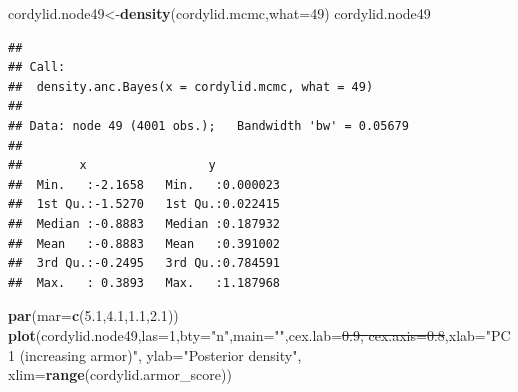 \documentclass[fleqn,10pt,lineno]{wlpeerj}
\newenvironment{Shaded}{\begin{snugshade}}{\end{snugshade}}
\newcommand{\AttributeTok}[1]{\textcolor[rgb]{0.13,0.29,0.53}{#1}}
\newcommand{\DecValTok}[1]{\textcolor[rgb]{0.00,0.00,0.81}{#1}}
\newcommand{\FloatTok}[1]{\textcolor[rgb]{0.00,0.00,0.81}{#1}}
\newcommand{\FunctionTok}[1]{\textcolor[rgb]{0.13,0.29,0.53}{\textbf{#1}}}
\newcommand{\NormalTok}[1]{#1}
\newcommand{\OtherTok}[1]{\textcolor[rgb]{0.56,0.35,0.01}{#1}}
\newcommand{\StringTok}[1]{\textcolor[rgb]{0.31,0.60,0.02}{#1}}
\providecommand{\DIFaddtex}[1]{{\protect\color{blue}\uwave{#1}}} %
\providecommand{\DIFdeltex}[1]{{\protect\color{red}\sout{#1}}}                      %
\providecommand{\DIFaddbegin}{} %
\providecommand{\DIFaddend}{} %
\providecommand{\DIFdelbegin}{} %
\providecommand{\DIFdelend}{} %
\providecommand{\DIFadd}[1]{\texorpdfstring{\DIFaddtex{#1}}{#1}} %
\providecommand{\DIFdel}[1]{\texorpdfstring{\DIFdeltex{#1}}{}} %
\newcommand{\DIFscaledelfig}{0.5}
\newlength{\DIFdelgraphicswidth} %
\newlength{\DIFdelgraphicsheight} %
\newcommand{\DIFaddincludegraphics}[2][]{{\color{blue}\fbox{\DIFOincludegraphics[#1]{#2}}}} %
\newcommand{\DIFdelincludegraphics}[2][]{%
\sbox{\DIFdelgraphicsbox}{\DIFOincludegraphics[#1]{#2}}%
\settoboxwidth{\DIFdelgraphicswidth}{\DIFdelgraphicsbox} %
\settoboxtotalheight{\DIFdelgraphicsheight}{\DIFdelgraphicsbox} %
\scalebox{\DIFscaledelfig}{%
\parbox[b]{\DIFdelgraphicswidth}{\usebox{\DIFdelgraphicsbox}\\[-\baselineskip] \rule{\DIFdelgraphicswidth}{0em}}\llap{\resizebox{\DIFdelgraphicswidth}{\DIFdelgraphicsheight}{%
\setlength{\unitlength}{\DIFdelgraphicswidth}%
\begin{picture}(1,1)%
\thicklines\linethickness{2pt} %
{\color[rgb]{1,0,0}\put(0,0){\framebox(1,1){}}}%
{\color[rgb]{1,0,0}\put(0,0){\line( 1,1){1}}}%
{\color[rgb]{1,0,0}\put(0,1){\line(1,-1){1}}}%
\end{picture}%
}\hspace*{3pt}}} %
} %
\DeclareRobustCommand{\DIFaddbegin}{\DIFOaddbegin \let\includegraphics\DIFaddincludegraphics} %
\DeclareRobustCommand{\DIFaddend}{\DIFOaddend \let\includegraphics\DIFOincludegraphics} %
\DeclareRobustCommand{\DIFdelbegin}{\DIFOdelbegin \let\includegraphics\DIFdelincludegraphics} %
\DeclareRobustCommand{\DIFdelend}{\DIFOaddend \let\includegraphics\DIFOincludegraphics} %
\begin{document}
\begin{Shaded}
\begin{Highlighting}[]
\NormalTok{cordylid.node49}\OtherTok{\textless{}{-}}\FunctionTok{density}\NormalTok{(cordylid.mcmc,}\AttributeTok{what=}\DecValTok{49}\NormalTok{)}
\NormalTok{cordylid.node49}
\end{Highlighting}
\end{Shaded}

\begin{verbatim}
## 
## Call:
##  density.anc.Bayes(x = cordylid.mcmc, what = 49)
## 
## Data: node 49 (4001 obs.);   Bandwidth 'bw' = 0.05679
## 
##        x                 y           
##  Min.   :-2.1658   Min.   :0.000023  
##  1st Qu.:-1.5270   1st Qu.:0.022415  
##  Median :-0.8883   Median :0.187932  
##  Mean   :-0.8883   Mean   :0.391002  
##  3rd Qu.:-0.2495   3rd Qu.:0.784591  
##  Max.   : 0.3893   Max.   :1.187968
\end{verbatim}

\begin{Shaded}
\begin{Highlighting}[]
\FunctionTok{par}\NormalTok{(}\AttributeTok{mar=}\FunctionTok{c}\NormalTok{(}\FloatTok{5.1}\NormalTok{,}\FloatTok{4.1}\NormalTok{,}\FloatTok{1.1}\NormalTok{,}\FloatTok{2.1}\NormalTok{))}
\FunctionTok{plot}\NormalTok{(cordylid.node49,}\AttributeTok{las=}\DecValTok{1}\NormalTok{,}\AttributeTok{bty=}\StringTok{"n"}\NormalTok{,}\AttributeTok{main=}\StringTok{""}\NormalTok{,}\AttributeTok{cex.lab=}\DIFdelbegin \DIFdel{\FloatTok{0.9}\NormalTok{,}
  \AttributeTok{cex.axis=}\FloatTok{0.8}}\DIFdelend \DIFaddbegin \DIFadd{\FloatTok{0.8}\NormalTok{,}
  \AttributeTok{cex.axis=}\FloatTok{0.7}}\DIFaddend \NormalTok{,}\AttributeTok{xlab=}\StringTok{"PC 1 (increasing armor)"}\NormalTok{,}
  \AttributeTok{ylab=}\StringTok{"Posterior density"}\NormalTok{,}
  \AttributeTok{xlim=}\FunctionTok{range}\NormalTok{(cordylid.armor\_score))}
\end{Highlighting}
\end{Shaded}
\end{document}
